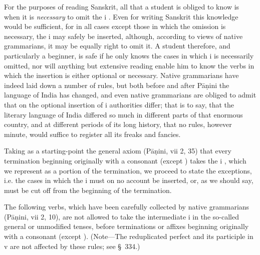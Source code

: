 For the purposes of reading Sanskrit, all that a student is obliged to
know is when it is \emph{necessary} to omit the {\dn i} . Even for
writing Sanskrit this knowledge would be sufficient, for in all cases
except those in which the omission is necessary, the {\dn i}  may
safely be inserted, although, according to views of native grammarians,
it may be equally right to omit it. A student therefore, and
particularly a beginner, is safe if he only knows the cases in which {\dn i}
 is necessarily omitted, nor will anything but extensive reading
enable him to know the verbs in which the insertion is either optional
or necessary. Native grammarians have indeed laid down a number of
rules, but both before and after Pāṇini the language of India has
changed, and even native grammarians are obliged to admit that on the
optional insertion of {\dn i}  authorities differ; that is to say,
that the literary language of India differed so much in different parts
of that enormous country, and at different periods of its long history,
that no rules, however minute, would suffice to register all its freaks
and fancies.

Taking as a starting-point the general axiom (Pāṇini, vii 2, 35) that
every termination beginning originally with a consonant (except {\dn {}}
) takes the {\dn i} , which we represent as a portion of the
termination, we proceed to state the exceptions, i.e. the cases in which
the {\dn i}  must on no account be inserted, or, as we should say,
must be cut off from the beginning of the termination.

\s The following verbs, which have been carefully collected by native
grammarians (Pāṇini, vii 2, 10), are not allowed to take the
intermediate {\dn i}  in the so-called general or unmodified tenses,
before terminations or affixes beginning originally with a consonant
(except {\dn {}} ). (Note—The reduplicated perfect and its participle
in {\dn v}  are not affected by these rules; see \S~334.)

